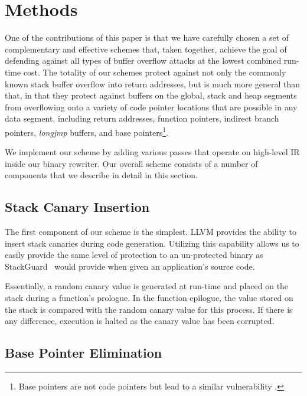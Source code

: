 \section{Methods}
\label{sec:methods}

One of the contributions of this paper is that we have carefully
chosen a set of complementary and effective schemes that, taken
together, achieve the goal of defending against all types of buffer
overflow attacks at the lowest combined run-time cost.  The totality
of our schemes protect against not only the commonly known stack
buffer overflow into return addresses, but is much more general than
that, in that they protect against buffers on the global, stack and
heap segments from overflowing onto a variety of code pointer
locations that are possible in any data segment, including return
addresses, function pointers, indirect branch pointers, \emph{longjmp}
buffers, and base pointers\footnote{Base pointers are not code
  pointers but lead to a similar vulnerability \cite{wilander2003}.}.

We implement our scheme by adding various passes that operate on
high-level IR inside our binary rewriter. Our overall scheme consists
of a number of components that we describe in detail in this section.

\subsection{Stack Canary Insertion}

The first component of our scheme is the simplest. LLVM provides the
ability to insert stack canaries during code generation. Utilizing
this capability allows us to easily provide the same level
of protection to an un-protected binary as
StackGuard~\cite{stackguard-98} would provide when given an
application's source code.

Essentially, a random canary value is generated at run-time and placed
on the stack during a function's prologue. In the function epilogue,
the value stored on the stack is compared with the random canary value
for this process. If there is any difference, execution is halted as
the canary value has been corrupted.

\subsection{Base Pointer Elimination}

